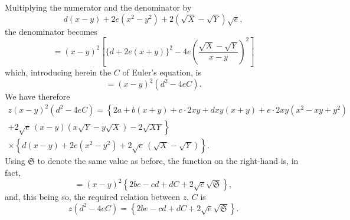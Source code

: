 \documentclass[11pt]{article}
\begin{document}
Multiplying the numerator and the denominator by
\[
d(x - y) + 2e(x^2 - y^2) + 2(\sqrt{X} - \sqrt{Y})\sqrt{e},
\]
the denominator becomes
\[
= (x - y)^2\!\left[\{d + 2e(x + y)\}^2 - 4e\!\left(\dfrac{\sqrt{X} - \sqrt{Y}}{x - y}\right)^{\!2}\right]
\]
which, introducing herein the $C$ of Euler's equation, is
\[
= (x - y)^2(d^2 - 4eC).
\]
We have therefore
\begin{multline*}
z(x - y)^2(d^2 - 4eC) = \!\left\{2a + b(x + y) + c\cdot 2xy + dxy(x + y) + e\cdot 2xy(x^2 - xy + y^2)\right.\\
\left. + 2\sqrt{e}\,(x - y)(x\sqrt{Y} - y\sqrt{X}) - 2\sqrt{XY}\right\}\\
\times\left\{d(x - y) + 2e(x^2 - y^2) + 2\sqrt{e}\,(\sqrt{X} - \sqrt{Y})\right\}.
\end{multline*}
Using $\mathfrak{S}$ to denote the same value as before, the function on the right-hand is, in fact,
\[
= (x - y)^2\!\left\{2be - cd + dC + 2\sqrt{e}\sqrt{\mathfrak{S}}\right\},
\]
and, this being so, the required relation between $z$, $C$ is
\[
z(d^2 - 4eC) = \!\left\{2be - cd + dC + 2\sqrt{e}\sqrt{\mathfrak{S}}\right\}.
\]
\end{document}
